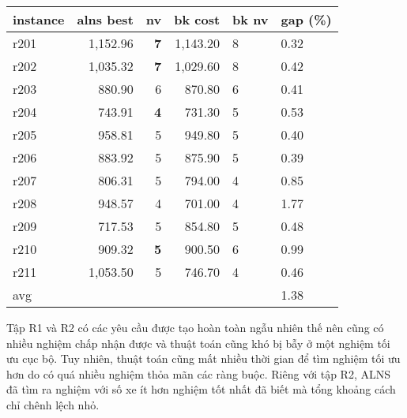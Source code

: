   \begin{table}[caption={Kết quả đo với tập Solomon R2}, label=exp:solomonR2]
    \centering
    \begin{tabular}{lrrrll}
    \hline
    instance & \multicolumn{1}{l}{alns best} & \multicolumn{1}{l}{nv} & \multicolumn{1}{l}{bk cost} & bk nv & gap (\%) \\ \hline
    r201 & 1,152.96 & \textbf{7} & 1,143.20 & 8 & 0.32 \\ 
    r202 & 1,035.32 & \textbf{7} & 1,029.60 & 8 & 0.42 \\ \hline
    r203 & 880.90 & 6 & 870.80 & 6 & 0.41 \\ \hline
    r204 & 743.91 & \textbf{4} & 731.30 & 5 & 0.53 \\ \hline
    r205 & 958.81 & 5 & 949.80 & 5 & 0.40 \\ \hline
    r206 & 883.92 & 5 & 875.90 & 5 & 0.39 \\ \hline
    r207 & 806.31 & 5 & 794.00 & 4 & 0.85 \\ \hline
    r208 & 948.57 & 4 & 701.00 & 4 & 1.77 \\ \hline
    r209 & 717.53 & 5 & 854.80 & 5 & 0.48 \\ \hline
    r210 & 909.32 & \textbf{5} & 900.50 & 6 & 0.99 \\ \hline
    r211 & 1,053.50 & 5 & 746.70 & 4 & 0.46 \\ \hline
    avg &  &  &  &  & 1.38 \\ \hline
    \end{tabular}
  \end{table}

  Tập R1 và R2 có các yêu cầu được tạo hoàn toàn ngẫu nhiên thế nên cũng có nhiều nghiệm chấp nhận được và thuật toán cũng khó bị bẫy ở một nghiệm tối ưu cục bộ. Tuy nhiên, thuật toán cũng mất nhiều thời gian để tìm nghiệm tối ưu hơn do có quá nhiều nghiệm thỏa mãn các ràng buộc. Riêng với tập R2, ALNS đã tìm ra nghiệm với số xe ít hơn nghiệm tốt nhất đã biết mà tổng khoảng cách chỉ chênh lệch nhỏ. 

